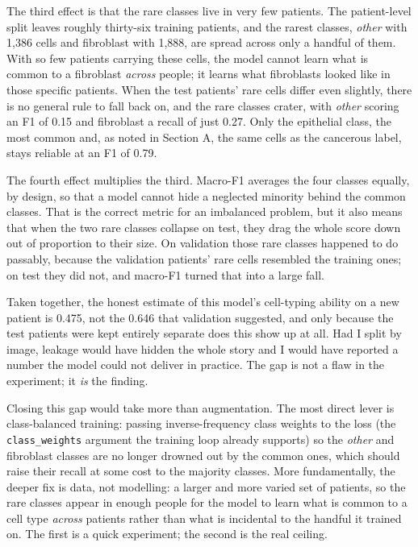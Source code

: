 \documentclass[
  11pt,
]{article}
\begin{document}
The third effect is that the rare classes live in very few patients. The
patient-level split leaves roughly thirty-six training patients, and the
rarest classes, \emph{other} with 1,386 cells and fibroblast with 1,888,
are spread across only a handful of them. With so few patients carrying
these cells, the model cannot learn what is common to a fibroblast
\emph{across} people; it learns what fibroblasts looked like in those
specific patients. When the test patients' rare cells differ even
slightly, there is no general rule to fall back on, and the rare classes
crater, with \emph{other} scoring an F1 of 0.15 and fibroblast a recall
of just 0.27. Only the epithelial class, the most common and, as noted
in Section A, the same cells as the cancerous label, stays reliable at
an F1 of 0.79.

The fourth effect multiplies the third. Macro-F1 averages the four
classes equally, by design, so that a model cannot hide a neglected
minority behind the common classes. That is the correct metric for an
imbalanced problem, but it also means that when the two rare classes
collapse on test, they drag the whole score down out of proportion to
their size. On validation those rare classes happened to do passably,
because the validation patients' rare cells resembled the training ones;
on test they did not, and macro-F1 turned that into a large fall.

Taken together, the honest estimate of this model's cell-typing ability
on a new patient is 0.475, not the 0.646 that validation suggested, and
only because the test patients were kept entirely separate does this
show up at all. Had I split by image, leakage would have hidden the
whole story and I would have reported a number the model could not
deliver in practice. The gap is not a flaw in the experiment; it
\emph{is} the finding.

Closing this gap would take more than augmentation. The most direct
lever is class-balanced training: passing inverse-frequency class
weights to the loss (the \texttt{class\_weights} argument the training
loop already supports) so the \emph{other} and fibroblast classes are no
longer drowned out by the common ones, which should raise their recall
at some cost to the majority classes. More fundamentally, the deeper fix
is data, not modelling: a larger and more varied set of patients, so the
rare classes appear in enough people for the model to learn what is
common to a cell type \emph{across} patients rather than what is
incidental to the handful it trained on. The first is a quick
experiment; the second is the real ceiling.
\end{document}
